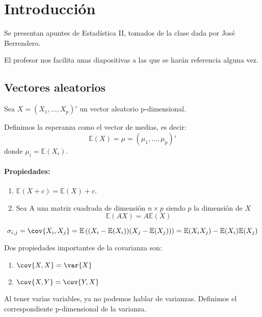 \section{Introducción}
Se presentan apuntes de Estadística II, tomados de la clase dada por José Berrendero.

El profesor nos facilita unas diapositivas a las que se harán referencia alguna vez.

\subsection{Vectores aleatorios}


Sea $X = (X_1, \dots , X_p)'$ un vector aleatorio p-dimensional.


\begin{defn}[Esperanza]
	Definimos la esperanza como el vector de medias, es decir:
	\[
	\mathbb{E}(X) = μ = (μ_1,\dots,μ_p)'
	\]
	donde $μ_i = \mathbb{E}(X_i)$.
\end{defn}


\paragraph{Propiedades:}
\begin{enumerate}
\item $\mathbb{E}(X+c) = \mathbb{E}(X)+c$.
\item Sea A una matriz cuadrada de dimensión $n\times p$ siendo $p$ la dimensión de $X$ \[\mathbb{E}(AX) = A\mathbb{E}(X)\]

\end{enumerate}



\begin{defn}[Covarianza]
\[\sigma_{i,j} = \cov{X_i,X_j} = \mathbb{E}\left((X_i-\mathbb{E}(X_i))(X_j-\mathbb{E}(X_j))\right) = \mathbb{E}(X_i X_j)-\mathbb{E}(X_i)\mathbb{E}(X_j)\]

Dos propiedades importantes de la covarianza son:

\begin{enumerate}
\item $\cov{X,X}= \var{X}$
\item $\cov{X,Y}=\cov{Y,X}$
\end{enumerate}

\end{defn}

Al tener varias variables, ya no podemos hablar de varianzas. Definimos el correspondiente p-dimensional de la varianza.


